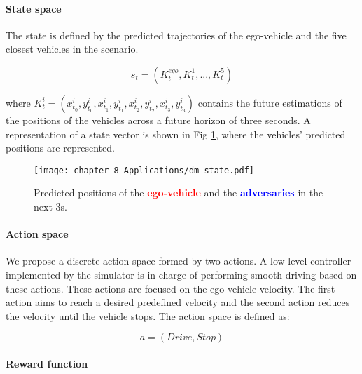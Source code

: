 \paragraph{State space}
\label{par:8_decision_making_our_approach_dm_state_space}

The state is defined by the predicted trajectories of the ego-vehicle and the five closest vehicles in the scenario.

\begin{equation}
	s_t = (K^{ego}_t, K^1_t, ..., K^{5}_t)
	\label{eq:state}
\end{equation}

where $K^{i}_t = (x^i_{t_0}, y^i_{t_0}, x^i_{t_1}, y^i_{t_1}, x^i_{t_2}, y^i_{t_2}, x^i_{t_3}, y^i_{t_3})$ contains the future estimations of the positions of the vehicles across a future horizon of three seconds. A representation of a state vector is shown in Fig \ref{fig:chapter_8_Applications/dm_state}, where the vehicles' predicted positions are represented.

\begin{figure}[h]
	\centering
	\texttt{[image: chapter\_8\_Applications/dm\_state.pdf]}
	\caption[Predicted positions of the ego-vehicle and the adversaries in the next 3s]{Predicted positions of the \textbf{\textcolor{red}{ego-vehicle}} and the \textbf{\textcolor{blue}{adversaries}} in the next 3s.}	
	\label{fig:chapter_8_Applications/dm_state}
\end{figure}

\paragraph{Action space}
\label{par:8_decision_making_our_approach_dm_action_space}

We propose a discrete action space formed by two actions. A low-level controller implemented by the simulator is in charge of performing smooth driving based on these actions. These actions are focused on the ego-vehicle velocity. The first action aims to reach a desired predefined velocity and the second action reduces the velocity until the vehicle stops. The action space is defined as:

\begin{equation}
	a=(Drive, Stop)    
	\label{eq:action}
\end{equation}

\paragraph{Reward function}
\label{par:8_decision_making_our_approach_dm_reward_function}

